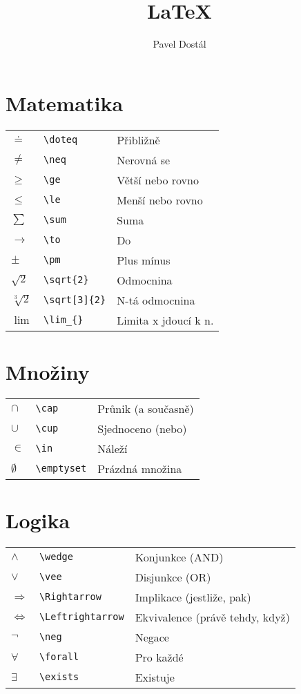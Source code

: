\documentclass{article}
\title{LaTeX}
\author{Pavel Dostál}
\newcommand{\dlim}{\displaystyle\lim}
\begin{document}
	\pagestyle{empty}
	\begin{multicols}{2}

		\section*{Matematika}
		\begin{tabular}{ p{2em} p{7.5em} l }
			$\doteq$			&	\verb|\doteq|				&	Přibližně							\\
			$\neq$				&	\verb|\neq|					&	Nerovná se						\\
			$\ge$					&	\verb|\ge|					&	Větší nebo rovno			\\
			$\le$					&	\verb|\le|					&	Menší nebo rovno			\\
			$\sum$				&	\verb|\sum|					&	Suma									\\
			$\to$					&	\verb|\to|					&	Do										\\
			$\pm$					&	\verb|\pm|					&	Plus mínus						\\
			$\sqrt{2}$		&	\verb|\sqrt{2}|			&	Odmocnina							\\
			$\sqrt[3]{2}$	&	\verb|\sqrt[3]{2}|	&	N-tá odmocnina				\\
			$\dlim$				&	\verb|\lim_{}|			&	Limita x jdoucí k n.	\\
		\end{tabular}

		\section*{Množiny}
		\begin{tabular}{ p{2em} p{7.5em} l }
			$\cap$			&	\verb|\cap|				&	Průnik (a současně)	\\
			$\cup$			&	\verb|\cup|				&	Sjednoceno (nebo)		\\
			$\in$				&	\verb|\in|				&	Náleží							\\
			$\emptyset$	&	\verb|\emptyset|	&	Prázdná množina			\\
		\end{tabular}

		\section*{Logika}
		\begin{tabular}{ p{2em} p{7.5em} l }
			$\wedge$					&	\verb|\wedge|		&	Konjunkce (AND)													\\
			$\vee$						&	\verb|\vee|			&	Disjunkce (OR)													\\
			$\Rightarrow$			&	\verb|\Rightarrow|	&	Implikace (jestliže, pak)						\\
			$\Leftrightarrow$	&	\verb|\Leftrightarrow|	&	Ekvivalence (právě tehdy, když)	\\
			$\neg$						&	\verb|\neg|			&	Negace																	\\
			$\forall$					&	\verb|\forall|		&	Pro každé															\\
			$\exists$					&	\verb|\exists|		&	Existuje
		\end{tabular}


\end{multicols}
\end{document}
